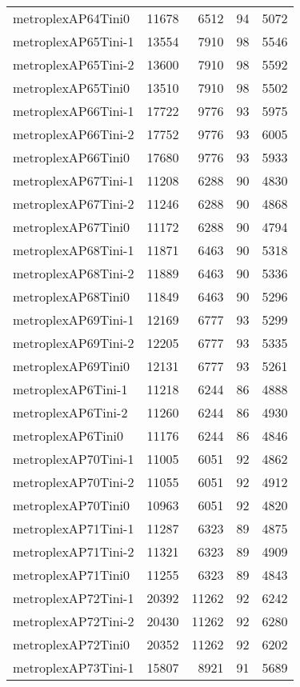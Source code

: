 \begin{longtable}{lrrrr}
metroplexAP64Tini0 & 11678 & 6512 & 94 & 5072 \\
metroplexAP65Tini-1 & 13554 & 7910 & 98 & 5546 \\
metroplexAP65Tini-2 & 13600 & 7910 & 98 & 5592 \\
metroplexAP65Tini0 & 13510 & 7910 & 98 & 5502 \\
metroplexAP66Tini-1 & 17722 & 9776 & 93 & 5975 \\
metroplexAP66Tini-2 & 17752 & 9776 & 93 & 6005 \\
metroplexAP66Tini0 & 17680 & 9776 & 93 & 5933 \\
metroplexAP67Tini-1 & 11208 & 6288 & 90 & 4830 \\
metroplexAP67Tini-2 & 11246 & 6288 & 90 & 4868 \\
metroplexAP67Tini0 & 11172 & 6288 & 90 & 4794 \\
metroplexAP68Tini-1 & 11871 & 6463 & 90 & 5318 \\
metroplexAP68Tini-2 & 11889 & 6463 & 90 & 5336 \\
metroplexAP68Tini0 & 11849 & 6463 & 90 & 5296 \\
metroplexAP69Tini-1 & 12169 & 6777 & 93 & 5299 \\
metroplexAP69Tini-2 & 12205 & 6777 & 93 & 5335 \\
metroplexAP69Tini0 & 12131 & 6777 & 93 & 5261 \\
metroplexAP6Tini-1 & 11218 & 6244 & 86 & 4888 \\
metroplexAP6Tini-2 & 11260 & 6244 & 86 & 4930 \\
metroplexAP6Tini0 & 11176 & 6244 & 86 & 4846 \\
metroplexAP70Tini-1 & 11005 & 6051 & 92 & 4862 \\
metroplexAP70Tini-2 & 11055 & 6051 & 92 & 4912 \\
metroplexAP70Tini0 & 10963 & 6051 & 92 & 4820 \\
metroplexAP71Tini-1 & 11287 & 6323 & 89 & 4875 \\
metroplexAP71Tini-2 & 11321 & 6323 & 89 & 4909 \\
metroplexAP71Tini0 & 11255 & 6323 & 89 & 4843 \\
metroplexAP72Tini-1 & 20392 & 11262 & 92 & 6242 \\
metroplexAP72Tini-2 & 20430 & 11262 & 92 & 6280 \\
metroplexAP72Tini0 & 20352 & 11262 & 92 & 6202 \\
metroplexAP73Tini-1 & 15807 & 8921 & 91 & 5689 \\

\end{longtable}

